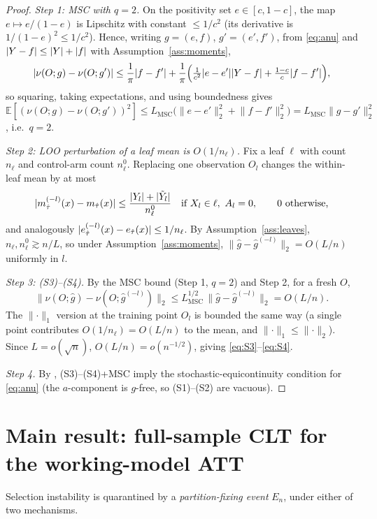 \documentclass[11pt]{article}
\theoremstyle{plain}
\theoremstyle{definition}
\theoremstyle{remark}
\newcommand{\E}{\mathbb{E}}
\newcommand{\Ltwo}[1]{\lVert #1 \rVert_{2}}
\DeclarePairedDelimiter{\abs}{\lvert}{\rvert}
\newcommand{\eT}{e_{\hat\tau}}
\newcommand{\mT}{m_{\hat\tau}}
\newcommand{\Ghat}{\hat g}
\newcommand{\odiff}{o}
\begin{document}
\begin{proof}
\emph{Step 1: MSC with $q=2$.} On the positivity set $e\in[c,1-c]$, the map
$e\mapsto e/(1-e)$ is Lipschitz with constant $\le 1/c^2$ (its derivative is
$1/(1-e)^2\le 1/c^2$). Hence, writing $g=(e,f)$, $g'=(e',f')$, from
\eqref{eq:anu} and $\abs{Y-f}\le\abs{Y}+\abs{f}$ with
Assumption~\ref{ass:moments},
\[
  \abs{\nu(O;g)-\nu(O;g')}
  \le \frac{1}{\pi}\abs{f-f'}
    +\frac{1}{\pi}\Bigl(\tfrac{1}{c^2}\abs{e-e'}\abs{Y-f}
      +\tfrac{1-c}{c}\abs{f-f'}\Bigr),
\]
so squaring, taking expectations, and using boundedness gives
$\E[(\nu(O;g)-\nu(O;g'))^2]\le L_{\mathrm{MSC}}\bigl(\Ltwo{e-e'}^2+\Ltwo{f-f'}^2\bigr)
=L_{\mathrm{MSC}}\Ltwo{g-g'}^2$, i.e.\ $q=2$.

\emph{Step 2: LOO perturbation of a leaf mean is $O(1/n_\ell)$.} Fix a leaf
$\ell$ with count $n_\ell$ and control-arm count $n_\ell^0$. Replacing one
observation $O_l$ changes the within-leaf mean by at most
\[
  \abs{\mT^{(-l)}(x)-\mT(x)}
  \le \frac{\abs{Y_l}+\abs{\tilde Y_l}}{n_\ell^0}
  \quad\text{if }X_l\in\ell,\ A_l=0,\qquad 0\text{ otherwise,}
\]
and analogously $\abs{\eT^{(-l)}(x)-\eT(x)}\le 1/n_\ell$. By
Assumption~\ref{ass:leaves}, $n_\ell,n_\ell^0\gtrsim n/L$, so under
Assumption~\ref{ass:moments},
$\Ltwo{\Ghat-\Ghat^{(-l)}}=O(L/n)$ uniformly in $l$.

\emph{Step 3: (S3)--(S4).} By the MSC bound (Step 1, $q=2$) and Step 2, for a
fresh $O$,
\[
  \bigl\lVert \nu(O;\Ghat)-\nu(O;\Ghat^{(-l)})\bigr\rVert_2
  \le L_{\mathrm{MSC}}^{1/2}\,\Ltwo{\Ghat-\Ghat^{(-l)}}
  = O(L/n).
\]
The $\lVert\cdot\rVert_1$ version at the training point $O_l$ is bounded the
same way (a single point contributes $O(1/n_\ell)=O(L/n)$ to the mean, and
$\lVert\cdot\rVert_1\le\lVert\cdot\rVert_2$). Since $L=\odiff(\sqrt n)$,
$O(L/n)=\odiff(n^{-1/2})$, giving \eqref{eq:S3}--\eqref{eq:S4}.

\emph{Step 4.} By \citet[Lemma~2]{ChenSyrgkanisAustern2022}, (S3)--(S4)+MSC imply
the stochastic-equicontinuity condition for \eqref{eq:anu} (the $a$-component is
$g$-free, so (S1)--(S2) are vacuous).
\end{proof}

\section{Main result: full-sample CLT for the working-model ATT}\label{sec:main}

Selection instability is quarantined by a \emph{partition-fixing event} $E_n$,
under either of two mechanisms.
\end{document}
